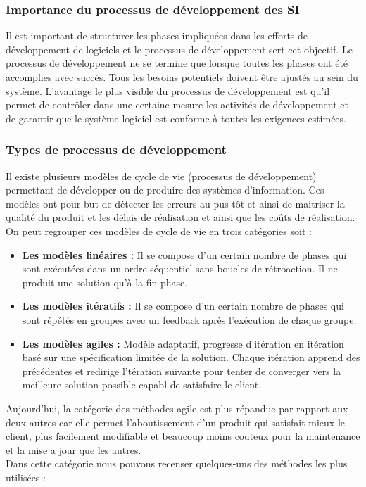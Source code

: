 \subsubsection{Importance du processus de développement des SI}
Il est important de structurer les phases impliquées dans les efforts de développement de logiciels et le processus de développement sert cet objectif. Le processus de développement ne se termine que lorsque toutes les phases ont été accomplies avec succès. Tous les besoins potentiels doivent être ajustés au sein du système. L'avantage le plus visible du processus de développement est qu'il permet de contrôler dans une certaine mesure les activités de développement et de garantir que le système logiciel est conforme à toutes les exigences estimées. 


\subsubsection{Types de processus de développement}
Il existe plusieurs modèles de cycle de vie (processus de développement) permettant de développer ou de produire des systèmes d’information. Ces modèles ont pour but de détecter les erreurs au pus tôt et ainsi de maitriser la qualité du produit et les délais de réalisation et ainsi que les coûts de réalisation. On peut regrouper ces modèles de cycle de vie en trois catégories soit :
\begin{itemize}
    \item \textbf{Les modèles linéaires :}  Il se compose d'un certain nombre de phases qui sont exécutées dans un ordre séquentiel sans boucles de rétroaction. Il ne produit une solution qu'à la fin phase.
    \item \textbf{Les modèles itératifs :} Il se compose d'un certain nombre de phases qui sont répétés en groupes avec un feedback après l'exécution de chaque groupe.
    \item \textbf{Les modèles agiles :} Modèle adaptatif, progresse d'itération en itération basé sur une spécification limitée de la solution. Chaque itération apprend des précédentes et redirige l'tération suivante pour tenter de converger vers la meilleure solution possible capabl de satisfaire le client.
\end{itemize}

Aujourd’hui, la catégorie des méthodes agile est plus répandue par rapport aux deux autres car elle permet l’aboutissement d’un produit qui satisfait mieux le client, plus facilement modifiable et beaucoup moins couteux pour la maintenance et la mise a jour que les autres.\\
Dans cette catégorie nous pouvons recenser quelques-uns des méthodes les plus utilisées :


